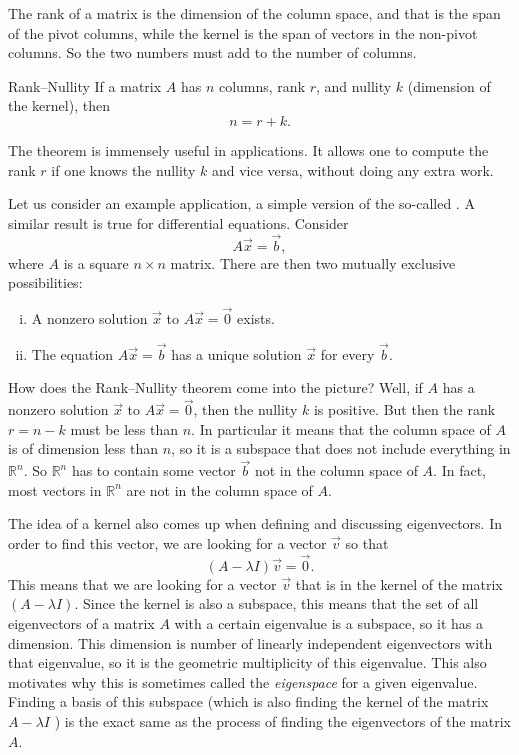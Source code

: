 The rank of a matrix is the dimension of the column space, and that is
the span of the pivot columns, while the kernel is the span of vectors in the 
non-pivot columns.  So the two numbers must add to the number of
columns.

\begin{theorem1}{Rank--Nullity}
If a matrix $A$ has $n$ columns, rank $r$, and nullity $k$ (dimension of the
kernel), then
\begin{equation*}
n = r+k .
\end{equation*}
\end{theorem1}

The theorem is immensely useful in applications.  It allows one to compute
the rank $r$ if one knows the nullity $k$ and vice versa, without doing any
extra work.

Let us consider an example application, a simple version of the so-called
\emph{}.  A similar result is true for
differential equations.  Consider
\begin{equation*}
A \vec{x} = \vec{b} ,
\end{equation*}
where $A$ is a square $n \times n$ matrix.
There are then two mutually exclusive possibilities:
\begin{enumerate}[(i)]
\item
A nonzero solution $\vec{x}$ to $A \vec{x} = \vec{0}$ exists.
\item
The equation $A \vec{x} = \vec{b}$ has a unique solution $\vec{x}$ for every
$\vec{b}$.
\end{enumerate}
How does the Rank--Nullity theorem come into the picture?  Well, if $A$ has
a nonzero solution $\vec{x}$ to $A \vec{x} = \vec{0}$, then the nullity $k$ is
positive.  But then the rank $r = n-k$ must be less than $n$.  In particular
it means that the column space of $A$ is of dimension less than $n$, so it is
a subspace that does not include everything in ${\mathbb{R}}^n$.
So ${\mathbb{R}}^n$ has to
contain some vector $\vec{b}$ not in the column space of $A$.  In fact, most
vectors in ${\mathbb{R}}^n$ are not in the column space of $A$.

The idea of a kernel also comes up when defining and discussing eigenvectors. In order to find this vector, we are looking for a vector $\vec{v}$ so that
\[ (A - \lambda I)\vec{v} = \vec{0}.\] This means that we are looking for a vector $\vec{v}$ that is in the kernel of the matrix $(A - \lambda I)$. Since the kernel is also a subspace, this means that the set of all eigenvectors of a matrix $A$ with a certain eigenvalue is a subspace, so it has a dimension. This dimension is number of linearly independent eigenvectors with that eigenvalue, so it is the geometric multiplicity of this eigenvalue. This also motivates why this is sometimes called the \emph{eigenspace} for a given eigenvalue. Finding a basis of this subspace (which is also finding the kernel of the matrix $A - \lambda I$ ) is the exact same as the process of finding the eigenvectors of the matrix $A$. 

